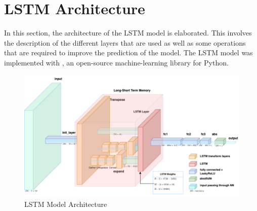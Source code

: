 \section{LSTM Architecture}
\label{sec:lstm-architecture-and-implementation}

  In this section, the architecture of the LSTM model is elaborated.
  This involves the description of the different layers that are used as well as some operations that are required to improve the prediction of the model.
  The LSTM model was implemented with , an open-source machine-learning library for Python. 
  \begin{figure}
    \centering
    \includegraphics[scale=0.45]{figures/current_lstm_model.png}
    \caption{LSTM Model Architecture}
    \label{fig:lstm-model-architecture}
  \end{figure}

